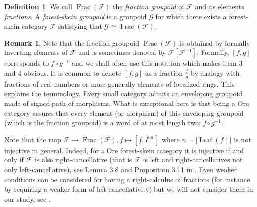 \documentclass[a4paper, 12pt]{amsart}
\numberwithin{equation}{section}
\theoremstyle{definition}
\newtheorem{definition}[theorem]{Definition}
\newtheorem{remark}[theorem]{Remark}
\newcommand{\cF}{\mathcal F}
\DeclareMathOperator{\Frac}{Frac}
\newcommand{\cG}{\mathcal G}
\DeclareMathOperator{\Leaf}{Leaf}
\newcommand{\ot}{\otimes}
\begin{document}
\begin{definition}
We call $\Frac(\cF)$ the \textit{fraction groupoid} of $\cF$ and its elements {\it fractions}.
A {\it forest-skein groupoid} is a groupoid $\cG$ for which there exists a forest-skein category $\cF$ satisfying that $\cG\simeq \Frac(\cF)$.
\end{definition}

\begin{remark}
Note that the fraction groupoid $\Frac(\cF)$ is obtained by formally inverting elements of $\cF$ and is sometimes denoted by $\cF[\cF^{-1}].$ 
Formally, $[f,g]$ corresponds to $f \circ g^{-1}$ and we shall often use this notation which makes item 3 and 4 obvious.
It is common to denote $[f,g]$ as a fraction $\frac{f}{g}$ by analogy with fractions of real numbers or more generally elements of localized rings. This explains the terminology.
Every small category admits an enveloping groupoid made of signed-path of morphisms. What is exceptional here is that being a Ore category assures that every element (or morphism) of this enveloping groupoid (which is the fraction groupoid) is a word of at most length two: $f\circ g^{-1}.$

Note that the map $\cF\to \Frac(\cF),f\mapsto [f,I^{\ot n}]$ where $n=|\Leaf(f)|$ is not injective in general. Indeed, for a Ore forest-skein category it is injective if and only if $\cF$ is also right-cancellative (that is $\cF$ is left and right-cancellatives not only left-cancellative), see Lemma 3.8 and Proposition 3.11 in \cite{Dehornoy-book}.
Even weaker conditions can be considered for having a right-calculus of fractions (for instance by requiring a weaker form of left-cancellativity) but we will not consider them in our study, see \cite{Gabriel-Zisman67}.
\end{remark}
\end{document}
